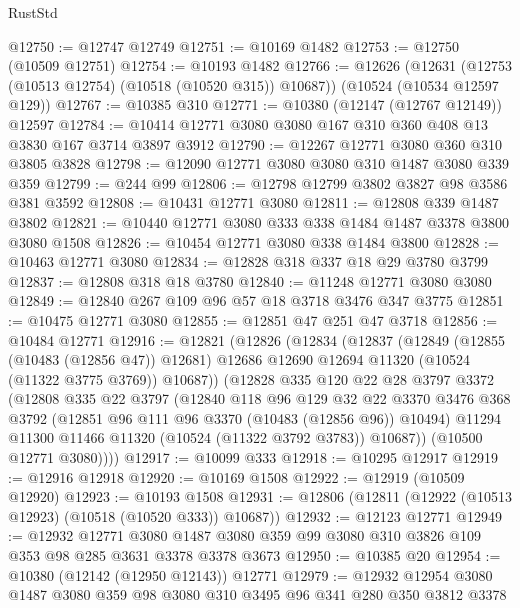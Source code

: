 \begin{lexlean}{RustStd}
\begin{coremodule}
@12750 := @12747 @12749
@12751 := @10169 @1482
@12753 := @12750 (@10509 @12751)
@12754 := @10193 @1482
@12766 := @12626
    (@12631 (@12753 (@10513 @12754) (@10518 (@10520 @315)) @10687))
    (@10524 (@10534 @12597 @129))
@12767 := @10385 @310
@12771 := @10380 (@12147 (@12767 @12149)) @12597
@12784 := @10414 @12771 @3080 @3080 @167 @310 @360 @408 @13 @3830 @167 @3714 @3897 @3912
@12790 := @12267 @12771 @3080 @360 @310 @3805 @3828
@12798 := @12090 @12771 @3080 @3080 @310 @1487 @3080 @339 @359
@12799 := @244 @99
@12806 := @12798 @12799 @3802 @3827 @98 @3586 @381 @3592
@12808 := @10431 @12771 @3080
@12811 := @12808 @339 @1487 @3802
@12821 := @10440 @12771 @3080 @333 @338 @1484 @1487 @3378 @3800 @3080 @1508
@12826 := @10454 @12771 @3080 @338 @1484 @3800
@12828 := @10463 @12771 @3080
@12834 := @12828 @318 @337 @18 @29 @3780 @3799
@12837 := @12808 @318 @18 @3780
@12840 := @11248 @12771 @3080 @3080
@12849 := @12840 @267 @109 @96 @57 @18 @3718 @3476 @347 @3775
@12851 := @10475 @12771 @3080
@12855 := @12851 @47 @251 @47 @3718
@12856 := @10484 @12771
@12916 := @12821
    (@12826
      (@12834
        (@12837
          (@12849
            (@12855 (@10483 (@12856 @47)) @12681)
            @12686
            @12690
            @12694
            @11320
            (@10524 (@11322 @3775 @3769))
            @10687))
        (@12828
          @335
          @120
          @22
          @28
          @3797
          @3372
          (@12808
            @335
            @22
            @3797
            (@12840
              @118
              @96
              @129
              @32
              @22
              @3370
              @3476
              @368
              @3792
              (@12851 @96 @111 @96 @3370 (@10483 (@12856 @96)) @10494)
              @11294
              @11300
              @11466
              @11320
              (@10524 (@11322 @3792 @3783))
              @10687))
          (@10500 @12771 @3080))))
@12917 := @10099 @333
@12918 := @10295 @12917
@12919 := @12916 @12918
@12920 := @10169 @1508
@12922 := @12919 (@10509 @12920)
@12923 := @10193 @1508
@12931 := @12806 (@12811 (@12922 (@10513 @12923) (@10518 (@10520 @333)) @10687))
@12932 := @12123 @12771
@12949 := @12932
    @12771
    @3080
    @1487
    @3080
    @359
    @99
    @3080
    @310
    @3826
    @109
    @353
    @98
    @285
    @3631
    @3378
    @3378
    @3673
@12950 := @10385 @20
@12954 := @10380 (@12142 (@12950 @12143)) @12771
@12979 := @12932
    @12954
    @3080
    @1487
    @3080
    @359
    @98
    @3080
    @310
    @3495
    @96
    @341
    @280
    @350
    @3812
    @3378

\end{coremodule}
\end{lexlean}
